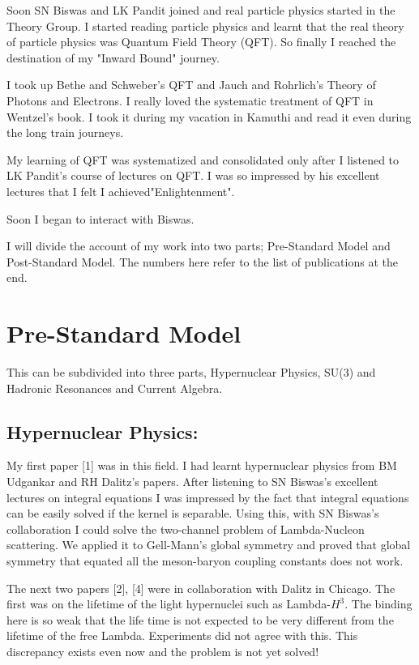 Soon SN Biswas and LK Pandit joined and real particle physics started in 
the Theory Group. I started reading particle physics and learnt that the 
real theory of particle physics was Quantum Field Theory (QFT). So 
finally I reached the destination of my "Inward Bound" journey.
\smallskip

I took up Bethe and Schweber's QFT and Jauch and Rohrlich's Theory of 
Photons and Electrons. I really loved the systematic treatment of QFT in 
Wentzel's book. I took it during my vacation in Kamuthi and read it even 
during the long train journeys.
\smallskip

My learning of QFT was systematized and consolidated only after I 
listened to LK Pandit's course of lectures on QFT. I was so impressed by 
his excellent lectures that I felt I achieved\break "Enlightenment".
\smallskip

Soon I began to interact with Biswas.
\smallskip

I will divide the account of my work into two parts; Pre-Standard Model 
and Post-Standard Model. The numbers here refer to the list of 
publications at the end.

\section*{Pre-Standard Model}

This can be subdivided into three parts, Hypernuclear Physics, 
SU(3) and Hadronic Resonances and Current Algebra.
\newpage

\subsection*{Hypernuclear Physics: }

My first paper [1] was in this field. I had learnt hypernuclear physics 
from BM Udgankar and RH Dalitz's papers. After liste\-ning to SN Biswas's 
excellent lectures on integral equations I was impressed by the fact 
that integral equations can be easily solved if the kernel is separable. 
Using this, with SN Biswas's collaboration I could solve the two-channel 
problem of Lambda-Nucleon scattering. We applied it to Gell-Mann's 
global symmetry and proved that global symmetry that equated all the 
meson-baryon coupling constants does not work.

The next two papers [2], [4] were in collaboration with Dalitz in Chicago. 
The first was on the lifetime of the light hypernuclei such as 
Lambda-$H^3$. The binding here is so weak that the life time is not 
expected to be very different from the lifetime of the free Lambda. 
Experiments did not agree with this. This discrepancy exists even now 
and the problem is not yet solved!

